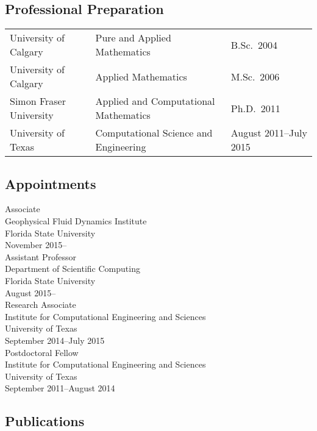 \documentclass[11pt]{article}
\begin{document}
\subsection{Professional Preparation}
\begin{tabular}{m{} m{} m{}}
University of Calgary & Pure and Applied Mathematics & B.Sc.~2004 \\
University of Calgary & Applied Mathematics & M.Sc.~2006 \\
Simon Fraser University & Applied and Computational Mathematics &
Ph.D.~2011 \\
University of Texas & Computational Science and Engineering & August 2011--July 2015
\end{tabular}


\subsection{Appointments}
Associate \\
Geophysical Fluid Dynamics Institute \\
Florida State University \\
November 2015--\\

\noindent
Assistant Professor \\
Department of Scientific Computing \\
Florida State University \\
August 2015--\\ 

\noindent
Research Associate \\
Institute for Computational Engineering and Sciences \\
University of Texas \\
September 2014--July 2015 \\

\noindent
Postdoctoral Fellow \\
Institute for Computational Engineering and Sciences \\
University of Texas \\
September 2011--August 2014


\subsection{Publications}
\end{document}

